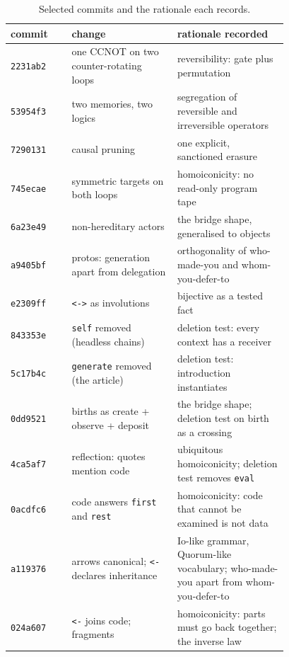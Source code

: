 \documentclass[11pt]{article}
\theoremstyle{definition}
\theoremstyle{remark}
\newcommand{\code}[1]{\texttt{#1}}
\begin{document}
\begin{table}[h]
\centering
\small
\begin{tabular}{@{}l p{0.38\linewidth} p{0.4\linewidth}@{}}
\toprule
commit & change & rationale recorded \\
\midrule
\code{2231ab2} & one CCNOT on two counter-rotating loops & reversibility: gate plus permutation \\
\code{53954f3} & two memories, two logics & segregation of reversible and irreversible operators \\
\code{7290131} & causal pruning & one explicit, sanctioned erasure \\
\code{745ecae} & symmetric targets on both loops & homoiconicity: no read-only program tape \\
\code{6a23e49} & non-hereditary actors & the bridge shape, generalised to objects \\
\code{a9405bf} & protos: generation apart from delegation & orthogonality of who-made-you and whom-you-defer-to \\
\code{e2309ff} & \code{<->} as involutions & bijective as a tested fact \\
\code{843353e} & \code{self} removed (headless chains) & deletion test: every context has a receiver \\
\code{5c17b4c} & \code{generate} removed (the article) & deletion test: introduction instantiates \\
\code{0dd9521} & births as create + observe + deposit & the bridge shape; deletion test on birth as a crossing \\
\code{4ca5af7} & reflection: quotes mention code & ubiquitous homoiconicity; deletion test removes \code{eval} \\
\code{0acdfc6} & code answers \code{first} and \code{rest} & homoiconicity: code that cannot be examined is not data \\
\code{a119376} & arrows canonical; \code{<-} declares inheritance & Io-like grammar, Quorum-like vocabulary; who-made-you apart from whom-you-defer-to \\
\code{024a607} & \code{<-} joins code; fragments & homoiconicity: parts must go back together; the inverse law \\
\bottomrule
\end{tabular}
\caption{Selected commits and the rationale each records.}
\label{tab:history}
\end{table}
\end{document}
